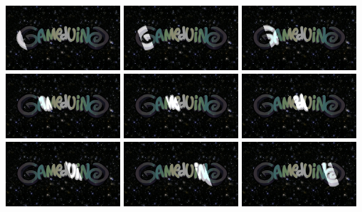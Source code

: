 \documentclass[10pt]{book}
\begin{document}
\begin{center}
\includegraphics[width=0.32\textwidth]{slotgag/00.png}
\includegraphics[width=0.32\textwidth]{slotgag/02.png}
\includegraphics[width=0.32\textwidth]{slotgag/04.png}
\includegraphics[width=0.32\textwidth]{slotgag/06.png}
\includegraphics[width=0.32\textwidth]{slotgag/08.png}
\includegraphics[width=0.32\textwidth]{slotgag/10.png}
\includegraphics[width=0.32\textwidth]{slotgag/12.png}
\includegraphics[width=0.32\textwidth]{slotgag/14.png}
\includegraphics[width=0.32\textwidth]{slotgag/16.png}
\end{center}
\end{document}
